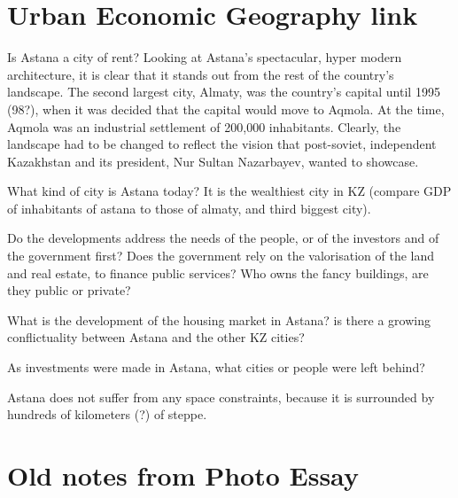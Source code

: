 \documentclass{article}
\begin{document}

\section{Urban Economic Geography link}

Is Astana a city of rent? Looking at Astana's spectacular, hyper modern architecture, it is clear that it stands out from the rest of the country's landscape. The second largest city, Almaty, was the country's capital until 1995 (98?), when it was decided that the capital would move to Aqmola. At the time, Aqmola was an industrial settlement of 200,000 inhabitants. Clearly, the landscape had to be changed to reflect the vision that post-soviet, independent Kazakhstan and its president, Nur Sultan Nazarbayev, wanted to showcase. 

What kind of city is Astana today? It is the wealthiest city in KZ (compare GDP of inhabitants of astana to those of almaty, and third biggest city). 

Do the developments address the needs of the people, or of the investors and of the government first?
Does the government rely on the valorisation of the land and real estate, to finance public services? Who owns the fancy buildings, are they public or private?

What is the development of the housing market in Astana?
is there a growing conflictuality between Astana and the other KZ cities?

As investments were made in Astana, what cities or people were left behind?

Astana does not suffer from any space constraints, because it is surrounded by hundreds of kilometers (?) of steppe. 



\section{Old notes from Photo Essay}
\end{document}
